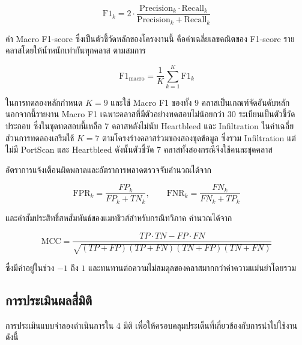 \begin{equation}
    \mathrm{F1}_{k} = 2 \cdot \frac{\mathrm{Precision}_{k} \cdot \mathrm{Recall}_{k}}{\mathrm{Precision}_{k} + \mathrm{Recall}_{k}}
\end{equation}

ค่า Macro F1-score ซึ่งเป็นตัวชี้วัดหลักของโครงงานนี้ คือค่าเฉลี่ยเลขคณิตของ F1-score รายคลาสโดยให้น้ำหนักเท่ากันทุกคลาส ตามสมการ

\begin{equation}
    \mathrm{F1_{macro}} = \frac{1}{K} \sum_{k=1}^{K} \mathrm{F1}_{k}
\end{equation}

ในการทดลองหลักกำหนด $K=9$ และใช้ Macro F1 ของทั้ง 9 คลาสเป็นเกณฑ์จัดอันดับหลัก นอกจากนี้รายงาน Macro F1 เฉพาะคลาสที่มีตัวอย่างทดสอบไม่น้อยกว่า 30 ระเบียนเป็นตัวชี้วัดประกอบ ซึ่งในชุดทดสอบนี้เหลือ 7 คลาสหลังไม่นับ Heartbleed และ Infiltration ในค่าเฉลี่ย ส่วนการทดลองเสริมใช้ $K=7$ ตามโครงร่างคลาสร่วมของสองชุดข้อมูล ซึ่งรวม Infiltration แต่ไม่มี PortScan และ Heartbleed ดังนั้นตัวชี้วัด 7 คลาสทั้งสองกรณีจึงใช้คนละชุดคลาส

อัตราการแจ้งเตือนผิดพลาดและอัตราการพลาดตรวจจับคำนวณได้จาก

\begin{equation}
    \mathrm{FPR}_{k} = \frac{FP_{k}}{FP_{k} + TN_{k}}, \qquad
    \mathrm{FNR}_{k} = \frac{FN_{k}}{FN_{k} + TP_{k}}
\end{equation}

และค่าสัมประสิทธิ์สหสัมพันธ์ของแมทธิวส์สำหรับกรณีทวิภาค คำนวณได้จาก

\begin{equation}
    \mathrm{MCC} = \frac{TP \cdot TN - FP \cdot FN}{\sqrt{(TP+FP)(TP+FN)(TN+FP)(TN+FN)}}
\end{equation}

ซึ่งมีค่าอยู่ในช่วง $-1$ ถึง $1$ และทนทานต่อความไม่สมดุลของคลาสมากกว่าค่าความแม่นยำโดยรวม \cite{matthews1975comparison, chicco2020mcc}

\subsection{การประเมินผลสี่มิติ}

การประเมินแบบจำลองดำเนินการใน 4 มิติ เพื่อให้ครอบคลุมประเด็นที่เกี่ยวข้องกับการนำไปใช้งาน ดังนี้

